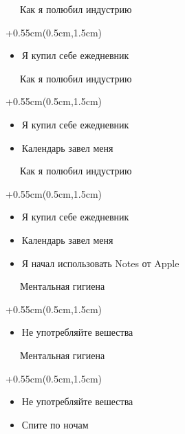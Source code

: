 \documentclass[xetex,18pt,aspectratio=169]{beamer}
\begin{document}
\begin{Large}
\begin{frame}{\ \ \ Как я полюбил индустрию}
\begin{textblock*}{\framewidth+0.55cm}(0.5cm,1.5cm)
\begin{itemize}
  \item Я купил себе ежедневник
\end{itemize}
\end{textblock*}
\end{frame}

\begin{frame}{\ \ \ Как я полюбил индустрию}
\begin{textblock*}{\framewidth+0.55cm}(0.5cm,1.5cm)
\begin{itemize}
  \item Я купил себе ежедневник
  \item Календарь завел меня
\end{itemize}
\end{textblock*}
\end{frame}

\begin{frame}{\ \ \ Как я полюбил индустрию}
\begin{textblock*}{\framewidth+0.55cm}(0.5cm,1.5cm)
\begin{itemize}
  \item Я купил себе ежедневник
  \item Календарь завел меня
  \item Я начал использовать Notes от Apple
\end{itemize}
\end{textblock*}
\end{frame}

\begin{frame}{\ \ \ Ментальная гигиена}
\begin{textblock*}{\framewidth+0.55cm}(0.5cm,1.5cm)
\begin{itemize}
  \item Не употребляйте вешества
\end{itemize}
\end{textblock*}
\end{frame}

\begin{frame}{\ \ \ Ментальная гигиена}
\begin{textblock*}{\framewidth+0.55cm}(0.5cm,1.5cm)
\begin{itemize}
  \item Не употребляйте вешества
  \item Спите по ночам
\end{itemize}
\end{textblock*}
\end{frame}


\end{Large}
\end{document}
